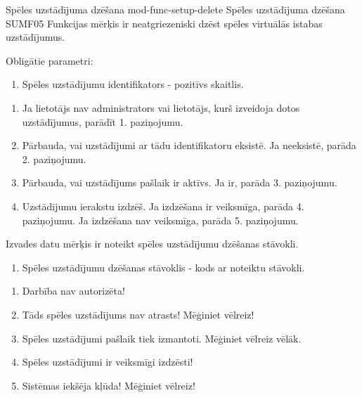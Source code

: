 \moduleFunctionTable
{Spēles uzstādījuma dzēšana}
{mod-func-setup-delete}
{Spēles uzstādījuma dzēšana}
{SUMF05}
{
	Funkcijas mērķis ir neatgriezeniski dzēst spēles virtuālās istabas uzstādījumus.
}
{
	Obligātie parametri:
	\begin{enumerate}
		\item Spēles uzstādījumu identifikators - pozitīvs skaitlis.
	\end{enumerate}
}
{
	\begin{enumerate}
		\item Ja lietotājs nav administrators vai lietotājs, kurš izveidoja dotos uzstādījumus, parādīt 1. paziņojumu.
		\item Pārbauda, vai uzstādījumi ar tādu identifikatoru eksistē.
		      Ja neeksistē, parāda 2. paziņojumu.
		\item Pārbauda, vai uzstādījums pašlaik ir aktīvs.
		      Ja ir, parāda 3. paziņojumu.
		\item Uzstādījumu ierakstu izdzēš.
		      Ja izdzēšana ir veiksmīga, parāda 4. paziņojumu.
		      Ja izdzēšana nav veiksmīga, parāda 5. paziņojumu.
	\end{enumerate}
}
{
	Izvades datu mērķis ir noteikt spēles uzstādījumu dzēšanas stāvokli.
	\begin{enumerate}
		\item Spēles uzstādījumu dzēšanas stāvoklis - kods ar noteiktu stāvokli.
	\end{enumerate}
}
{
	\begin{enumerate}
		\item Darbība nav autorizēta!
		\item Tāds spēles uzstādījums nav atrasts! Mēģiniet vēlreiz!
		\item Spēles uzstādījumi pašlaik tiek izmantoti. Mēģiniet vēlreiz vēlāk.
		\item Spēles uzstādījumi ir veiksmīgi izdzēsti!
		\item Sistēmas iekšēja kļūda! Mēģiniet vēlreiz!
	\end{enumerate}
}
